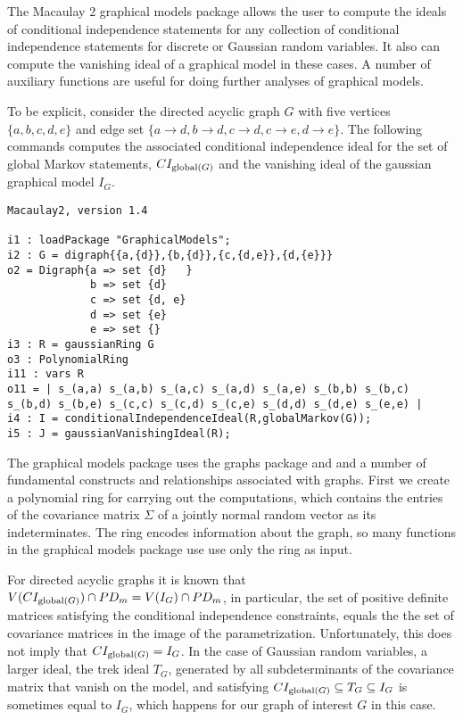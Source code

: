 \documentclass{article}
\theoremstyle{definition}
\begin{document}
The Macaulay 2 graphical models package allows the user to compute
the ideals of conditional independence statements for any collection
of conditional independence statements for discrete or Gaussian
random variables.  It also can compute the vanishing ideal of 
a graphical model in these cases.  A number of auxiliary functions
are useful for doing further analyses of graphical models.

To be explicit, consider the directed acyclic graph $G$ with  five
vertices $\{a,b,c,d,e\}$ and edge
set $\{a \to d, b \to d, c \to d, c \to e, d \to e\}$.
The following commands computes the associated conditional
independence ideal for the set of global Markov statements,
$CI_{{\rm global}(G)}$ and 
the vanishing ideal of the gaussian graphical model $I_{G}$.

\begin{verbatim}
Macaulay2, version 1.4

i1 : loadPackage "GraphicalModels";
i2 : G = digraph{{a,{d}},{b,{d}},{c,{d,e}},{d,{e}}} 
o2 = Digraph{a => set {d}   }
             b => set {d}
             c => set {d, e}
             d => set {e}
             e => set {}
i3 : R = gaussianRing G
o3 : PolynomialRing
i11 : vars R
o11 = | s_(a,a) s_(a,b) s_(a,c) s_(a,d) s_(a,e) s_(b,b) s_(b,c) s_(b,d) s_(b,e) s_(c,c) s_(c,d) s_(c,e) s_(d,d) s_(d,e) s_(e,e) |
i4 : I = conditionalIndependenceIdeal(R,globalMarkov(G));
i5 : J = gaussianVanishingIdeal(R);
\end{verbatim}
The graphical models package uses the graphs package and 
and a number of fundamental constructs and relationships 
associated with graphs.  First we create a polynomial ring
for carrying out the computations, which contains the entries of
the covariance matrix $\Sigma$ of a jointly normal random vector
as its indeterminates.  The ring encodes information about the
graph, so many functions in the graphical models package use 
use only the ring as input.

For directed acyclic graphs it is known that 
$V(CI_{{\rm global}(G)}) \cap PD_{m}  =  
V(I_{G}) \cap PD_{m}$,
in particular, the set of positive definite matrices
satisfying the conditional independence constraints, equals the
the set of covariance matrices in the image of the parametrization.
Unfortunately, this does not imply that $CI_{{\rm global}(G)} 
=I_{G}$.  In the case of Gaussian random variables, a larger ideal,
the trek ideal $T_{G}$, generated by all subdeterminants of the 
covariance matrix that vanish on the model, and satisfying
$CI_{{\rm global}(G)} \subseteq T_{G} \subseteq
I_{G}$ is sometimes equal to $I_{G}$, which happens for our
graph of interest $G$ in this case.
\end{document}
